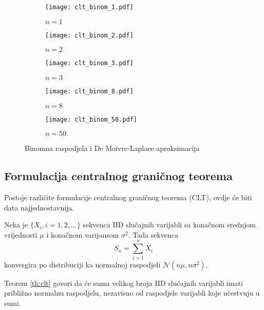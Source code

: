 \begin{figure}[H]
  \centering
  \begin{subfigure}[b]{0.3\textwidth}
    \centering
    \texttt{[image: clt\_binom\_1.pdf]}
    \caption{$n=1$}
    \label{fig:binom:a}
  \end{subfigure}
  \vspace{10pt}
	\begin{subfigure}[b]{0.3\textwidth}
		\centering
    \texttt{[image: clt\_binom\_2.pdf]}
    \caption{$n=2$}
    \label{fig:binom:b}
	\end{subfigure}
	\begin{subfigure}[b]{0.3\textwidth}
		\centering
    \texttt{[image: clt\_binom\_3.pdf]}
    \caption{$n=3$}
    \label{fig:binom:c}
	\end{subfigure}
	\begin{subfigure}[b]{0.3\textwidth}
		\centering
    \texttt{[image: clt\_binom\_8.pdf]}
    \caption{$n=8$}
    \label{fig:binom:d}
	\end{subfigure}
	\begin{subfigure}[b]{0.3\textwidth}
		\centering
    \texttt{[image: clt\_binom\_50.pdf]}
    \caption{$n=50$}
    \label{fig:binom:e}
	\end{subfigure}
	\caption{Binomna raspodjela i De Moivre-Laplace aproksimacija}
  \label{fig:binom}
\end{figure}

\subsection{Formulacija centralnog graničnog teorema}

Postoje različite formulacije centralnog graničnog teorema (CLT), ovdje će biti
data najjednostavnija.

\begin{theorem} \label{th:clt}
  Neka je $\{X_i, i=1,2,...\}$ sekvenca IID slučajnih varijabli sa
  konačnom srednjom vrijednosti $\mu$ i konačnom varijansom $\sigma^2$. Tada
  sekvenca $$S_n = \sum_{i=1}^{n} X_i$$ konvergira po distribuciji ka normalnoj
  raspodjeli $\mathcal{N}(n\mu, n\sigma^2)$.
\end{theorem}

Teorem \ref{th:clt} govori da će suma velikog broja IID slučajnih varijabli
imati približno normalnu raspodjelu, nezavisno od raspodjele varijabli koje
učestvuju u sumi.

